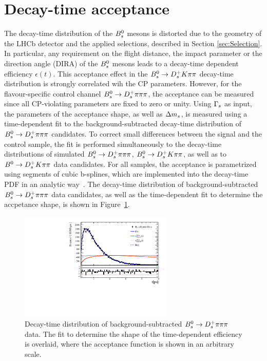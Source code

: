 \section{Decay-time acceptance}
\label{sec:Acceptance}

The decay-time distribution of the ${{B}^0_{s}}$ mesons is distorted due to the geometry of the LHCb detector and the applied selections, described in Section \ref{sec:Selection}.
In particular, any requirement on the flight distance, the impact parameter or the direction angle (DIRA) of the ${{B}^0_{s}}$ mesons leads to a decay-time dependent efficiency $\epsilon(t)$.
This acceptance effect in the ${{B}^0_{s}}\rightarrow{\ensuremath{{D}^+_{s}}}{\ensuremath{K}}{\ensuremath{\pi}}{\ensuremath{\pi}}$ decay-time distribution is strongly correlated wih the CP parameters. \newline
However, for the flavour-specific control channel ${{B}^0_{s}}\rightarrow{\ensuremath{{D}^+_{s}}}{\ensuremath{\pi}}{\ensuremath{\pi}}{\ensuremath{\pi}}$, the acceptance can be measured since all CP-violating parameters are fixed to zero or unity. 
Using ${\Gamma_{{s}}}$ as input, the parameters of the acceptance shape, as well as ${\Delta m_{{s}}}$, is measured using a time-dependent fit to the background-subtracted decay-time distribution of ${{B}^0_{s}}\rightarrow{\ensuremath{{D}^+_{s}}}{\ensuremath{\pi}}{\ensuremath{\pi}}{\ensuremath{\pi}}$ candidates.
To correct small differences between the signal and the control sample, 
the fit is performed simultaneously to the decay-time distributions of simulated  ${{B}^0_{s}}\rightarrow{\ensuremath{{D}^+_{s}}}{\ensuremath{\pi}}{\ensuremath{\pi}}{\ensuremath{\pi}}$, ${{B}^0_{s}}\rightarrow{\ensuremath{{D}^+_{s}}}{\ensuremath{K}}{\ensuremath{\pi}}{\ensuremath{\pi}}$, as well as to ${{B}^0}\rightarrow{\ensuremath{{D}^+_{s}}}{\ensuremath{K}}{\ensuremath{\pi}}{\ensuremath{\pi}}$ data candidates.
For all samples, the acceptance is parametrized using segments of cubic b-splines, which are implemented into the decay-time PDF in an analytic way~\cite{Karbach:2014qba}.
The decay-time distribution of background-subtracted ${{B}^0_{s}}\rightarrow{\ensuremath{{D}^+_{s}}}{\ensuremath{\pi}}{\ensuremath{\pi}}{\ensuremath{\pi}}$ data candidates, as well as the time-dependent fit to determine the accpetance shape, is shown in Figure~\ref{fig:accFit}.

\begin{figure}[h]
\centering
\includegraphics[height=!,width=0.65\textwidth]{figs/Acceptance/adaptive_N4/timeAccRatioFit_norm_Run2_t0.pdf}
\caption{Decay-time distribution of background-subtracted ${{B}^0_{s}}\rightarrow{\ensuremath{{D}^+_{s}}}{\ensuremath{\pi}}{\ensuremath{\pi}}{\ensuremath{\pi}}$ data. The fit to determine the shape of the time-dependent efficiency is overlaid, where the acceptance function is shown in an arbitrary scale.}
\label{fig:accFit}
\end{figure}

